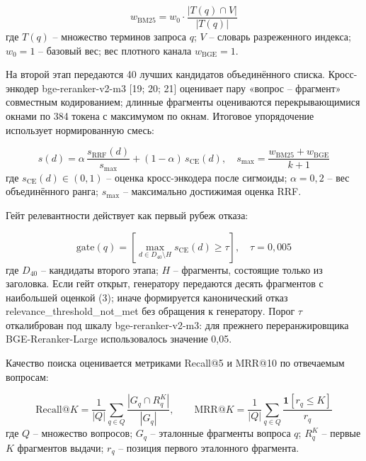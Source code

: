 \documentclass[14pt,a4paper]{extarticle}
\begin{document}
\begin{equation}
w_{\mathrm{BM25}} = w_0 \cdot \frac{|T(q) \cap V|}{|T(q)|}
\tag{2}
\end{equation}
\noindent где $T(q)$ – множество терминов запроса $q$; $V$ – словарь разреженного индекса; $w_0 = 1$ – базовый вес; вес плотного канала $w_{\mathrm{BGE}} = 1$.

На второй этап передаются 40 лучших кандидатов объединённого списка. Кросс-энкодер bge-reranker-v2-m3 [19; 20; 21] оценивает пару «вопрос – фрагмент» совместным кодированием; длинные фрагменты оцениваются перекрывающимися окнами по 384 токена с максимумом по окнам. Итоговое упорядочение использует нормированную смесь:

\begin{equation}
s(d) = \alpha \, \frac{s_{\mathrm{RRF}}(d)}{s_{\max}} + (1 - \alpha)\, s_{\mathrm{CE}}(d), \quad s_{\max} = \frac{w_{\mathrm{BM25}} + w_{\mathrm{BGE}}}{k + 1}
\tag{3}
\end{equation}
\noindent где $s_{\mathrm{CE}}(d) \in (0, 1)$ – оценка кросс-энкодера после сигмоиды; $\alpha = 0{,}2$ – вес объединённого ранга; $s_{\max}$ – максимально достижимая оценка RRF.

Гейт релевантности действует как первый рубеж отказа:

\begin{equation}
\mathrm{gate}(q) = \left[\max_{d \in D_{40} \setminus H} s_{\mathrm{CE}}(d) \ge \tau\right], \quad \tau = 0{,}005
\tag{4}
\end{equation}
\noindent где $D_{40}$ – кандидаты второго этапа; $H$ – фрагменты, состоящие только из заголовка. Если гейт открыт, генератору передаются десять фрагментов с наибольшей оценкой (3); иначе формируется канонический отказ relevance\_threshold\_not\_met без обращения к генератору. Порог $\tau$ откалиброван под шкалу bge-reranker-v2-m3: для прежнего переранжировщика BGE-Reranker-Large использовалось значение 0,05.

Качество поиска оценивается метриками Recall@5 и MRR@10 по отвечаемым вопросам:

\begin{equation}
\mathrm{Recall@}K = \frac{1}{|Q|} \sum_{q \in Q} \frac{|G_q \cap R_q^{K}|}{|G_q|}, \qquad \mathrm{MRR@}K = \frac{1}{|Q|} \sum_{q \in Q} \frac{\mathbf{1}[r_q \le K]}{r_q}
\tag{5}
\end{equation}
\noindent где $Q$ – множество вопросов; $G_q$ – эталонные фрагменты вопроса $q$; $R_q^{K}$ – первые $K$ фрагментов выдачи; $r_q$ – позиция первого эталонного фрагмента.
\end{document}
